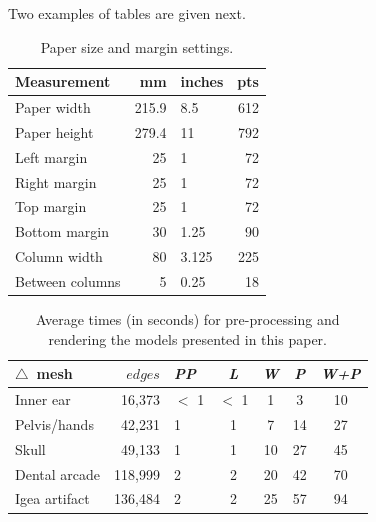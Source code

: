 \documentclass[accepted,single]{gipaper}
\begin{document}
Two examples of tables are given next.


\begin{table}[th]
\begin{center}
\begin{tabular}{ lrlr }
Measurement & mm & inches & pts \\
\hline
Paper width     & 215.9 & 8.5    & 612 \\
Paper height    & 279.4 & 11    & 792 \\
\hline
Left margin     & 25 & 1      & 72 \\
Right margin    & 25 & 1      & 72 \\
Top margin      & 25 & 1      & 72 \\
Bottom margin   & 30 & 1.25   & 90 \\
\hline
Column width    & 80 & 3.125  & 225 \\
Between columns &  5 & 0.25   & 18 \\
\hline
\end{tabular}
\end{center}
\caption{Paper size and margin settings.} \label{tab1}
\end{table}


\begin{table}[htpb]
\label{timings}
\begin{center}
\begin{small}
\begin{tabular}{lrlcccc}
$\triangle$~mesh & $edges$ & {\em PP} & {\em L} & {\em W} & {\em P} & {\em W+P}\\
\hline
Inner ear          &  16,373 & $<$ 1 & $<$ 1 &  1 &  3 & 10   \\
Pelvis/hands       &  42,231 &   1 &   1 &  7 & 14 & 27   \\
Skull              &  49,133 &   1 &   1 & 10 & 27 & 45   \\
Dental arcade      & 118,999 &   2 &   2 & 20 & 42 & 70   \\
Igea artifact      & 136,484 &   2 &   2 & 25 & 57 & 94
\end{tabular}
\end{small}
\end{center}
\caption{Average times (in seconds) for pre-processing and
rendering the models presented in this paper.}
\end{table}
\end{document}
